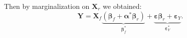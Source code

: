 \documentclass[12pt,a4paper]{report}
\begin{document}
Then by marginalization on $\boldsymbol{X}_r$ we obtained:
		\begin{equation}
		\boldsymbol{Y}%
		= \boldsymbol{X}_f\underbrace{(\boldsymbol{\beta}_f+\boldsymbol{\alpha}^*\boldsymbol{\beta}_r)}_{\boldsymbol{\beta}^*_f}+\underbrace{\boldsymbol{\varepsilon}\boldsymbol{\beta}_r+\boldsymbol{\varepsilon}_Y}_{\boldsymbol{\varepsilon}_Y^*}.  \label{pluginorig}
		\end{equation}

  
\end{document}

